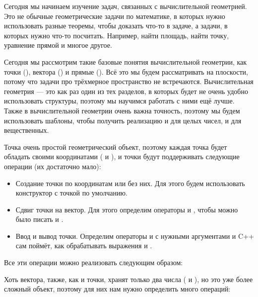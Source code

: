 Сегодня мы начинаем изучение задач, связанных с вычислительной геометрией. Это не обычные геометрические задачи по математике, в которых нужно использовать разные теоремы, чтобы доказать что-то в задаче, а задачи, в которых нужно что-то посчитать. Например, найти площадь, найти точку, уравнение прямой и многое другое.

Сегодня мы рассмотрим такие базовые понятия вычислительной геометрии, как точки (), вектора () и прямые (). Всё это мы будем рассматривать на плоскости, потому что задачи про трёхмерное пространство не встречаются. Вычислительная геометрия — это как раз один из тех разделов, в которых будет не очень удобно использовать структуры, поэтому мы научимся работать с ними ещё лучше. Также в вычислительной геометрии очень важна точность, поэтому мы будем использовать шаблоны, чтобы получить реализацию и для целых чисел, и для вещественных.


Точка очень простой геометрический объект, поэтому каждая точка будет обладать своими координатами ( и ), и точки будут поддерживать следующие операции (их достаточно мало):

\begin{itemize}
    \item Создание точки по координатам или без них. Для этого будем использовать конструктор с точкой  по умолчанию.
    \item Сдвиг точки на вектор. Для этого определим операторы \lcpp{+} и \lcpp{-}, чтобы можно было писать  и .
    \item Ввод и вывод точки. Определим операторы \lcpp{>>} и \lcpp{<<} с нужными аргументами и C++ сам поймёт, как обрабатывать выражения  и .
\end{itemize}

Все эти операции можно реализовать следующим образом:

\nocode


Хоть вектора, также, как и точки, хранят только два числа ( и ), но это уже более сложный объект, поэтому для них нам нужно определить много операций:

